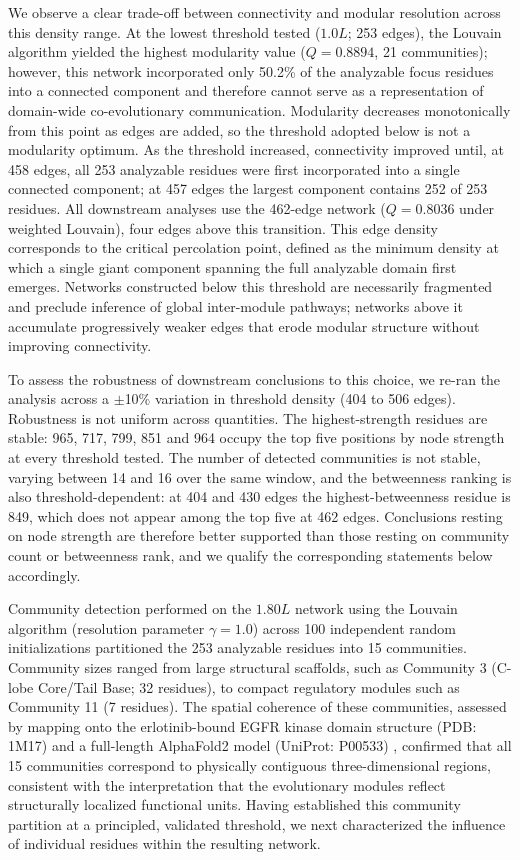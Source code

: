 \documentclass[utf8]{FrontiersinHarvard}
\begin{document}
We observe a clear trade-off between connectivity and modular resolution across this density range. At the lowest threshold tested ($1.0L$; 253 edges), the Louvain algorithm yielded the highest modularity value ($Q = 0.8894$, 21 communities); however, this network incorporated only 50.2\% of the analyzable focus residues into a connected component and therefore cannot serve as a representation of domain-wide co-evolutionary communication. Modularity decreases monotonically from this point as edges are added, so the threshold adopted below is not a modularity optimum. As the threshold increased, connectivity improved until, at 458 edges, all 253 analyzable residues were first incorporated into a single connected component; at 457 edges the largest component contains 252 of 253 residues. All downstream analyses use the 462-edge network ($Q = 0.8036$ under weighted Louvain), four edges above this transition. This edge density corresponds to the critical percolation point, defined as the minimum density at which a single giant component spanning the full analyzable domain first emerges. Networks constructed below this threshold are necessarily fragmented and preclude inference of global inter-module pathways; networks above it accumulate progressively weaker edges that erode modular structure without improving connectivity.

To assess the robustness of downstream conclusions to this choice, we re-ran the analysis across a $\pm$10\% variation in threshold density (404 to 506 edges). Robustness is not uniform across quantities. The highest-strength residues are stable: 965, 717, 799, 851 and 964 occupy the top five positions by node strength at every threshold tested. The number of detected communities is not stable, varying between 14 and 16 over the same window, and the betweenness ranking is also threshold-dependent: at 404 and 430 edges the highest-betweenness residue is 849, which does not appear among the top five at 462 edges. Conclusions resting on node strength are therefore better supported than those resting on community count or betweenness rank, and we qualify the corresponding statements below accordingly.

Community detection performed on the $1.80L$ network using the Louvain algorithm (resolution parameter $\gamma = 1.0$) across 100 independent random initializations partitioned the 253 analyzable residues into 15 communities. Community sizes ranged from large structural scaffolds, such as Community 3 (C-lobe Core/Tail Base; 32 residues), to compact regulatory modules such as Community 11 (7 residues). The spatial coherence of these communities, assessed by mapping onto the erlotinib-bound EGFR kinase domain structure (PDB: 1M17) \citep{Stamos2002} and a full-length AlphaFold2 model (UniProt: P00533) \citep{Jumper2021,UniProt2023}, confirmed that all 15 communities correspond to physically contiguous three-dimensional regions, consistent with the interpretation that the evolutionary modules reflect structurally localized functional units. Having established this community partition at a principled, validated threshold, we next characterized the influence of individual residues within the resulting network.
\end{document}
